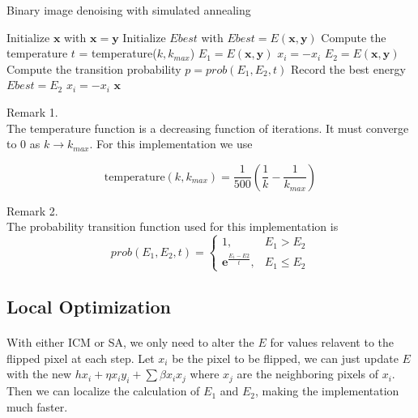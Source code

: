\documentclass{article}
\begin{document}
\begin{algorithm}
\centering
\caption{Binary image denoising with simulated annealing}
\label{alg:sa}
  \begin{algorithmic}[1]
        \State Initialize $\mathbf{x}$ with $\mathbf{x} = \mathbf{y}$
        \State Initialize $Ebest$ with $Ebest = E(\mathbf{x}, \mathbf{y})$
	    	\State Compute the temperature $t$ = temperature($k,k_{max}$)
	    		\State $E_1 = E(\mathbf{x}, \mathbf{y})$
	    		\State $x_{i} = - x_{i}$ 
	    		\State $E_2 = E(\mathbf{x}, \mathbf{y})$
	    		\State Compute the transition probability $p = prob(E_1, E_2, t)$
		    			\State Record the best energy $Ebest = E_2$
		    		\EndIf
		    	\Else
		    		\State $x_{i} = - x_{i}$ 
		    	\EndIf
	    	\EndFor
	    \EndFor
      \Return $\mathbf{x}$
    \EndFunction
  \end{algorithmic}
\end{algorithm}

\begin{description}
\item Remark 1.\hfill \\
The temperature function is a decreasing function of iterations. It must converge to $0$ as $k \to k_{max}$. For this implementation we use

$$
\text{temperature}(k, k_{max}) = \frac{1}{500}(\frac{1}{k} - \frac{1}{k_{max}})
$$
\item Remark 2.\hfill \\
The probability transition function used for this implementation is
$$
prob(E_1, E_2, t) =  \left\{
     \begin{array}{lr}
       1, & E_1 > E_2 \\
       \mathbf{e}^{\frac{E_1 - E2}{t}}, & E_1 \leq E_2
     \end{array}
   \right.
$$
\end{description}

\subsection{Local Optimization}

\paragraph{}
With either ICM or SA, we only need to alter the $E$ for values relavent to the flipped pixel at each step. Let $x_i$ be the pixel to be flipped, we can just update $E$ with the new $hx_i + \eta x_i y_i + \sum \beta x_i x_j$ where $x_j$ are the neighboring pixels of $x_i$. Then we can localize the calculation of $E_1$ and $E_2$, making the implementation much faster.
\end{document}
